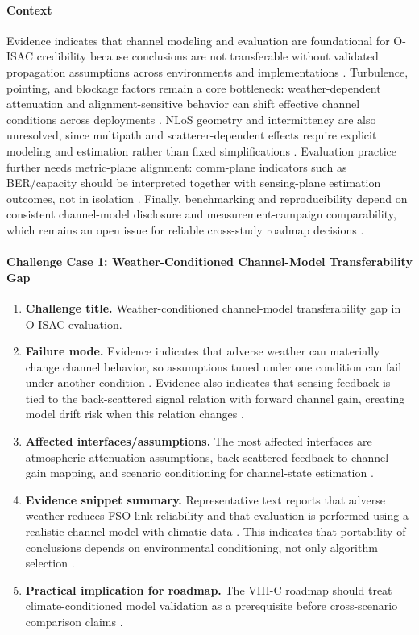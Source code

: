 \documentclass[lettersize,journal]{IEEEtran}
\begin{document}
\paragraph{Context}
Evidence indicates that channel modeling and evaluation are foundational for O-ISAC credibility because conclusions are not transferable without validated propagation assumptions across environments and implementations \cite{O_ISAC_005, O_ISAC_327}. Turbulence, pointing, and blockage factors remain a core bottleneck: weather-dependent attenuation and alignment-sensitive behavior can shift effective channel conditions across deployments \cite{O_ISAC_005, O_ISAC_327}. NLoS geometry and intermittency are also unresolved, since multipath and scatterer-dependent effects require explicit modeling and estimation rather than fixed simplifications \cite{O_ISAC_050}. Evaluation practice further needs metric-plane alignment: comm-plane indicators such as BER/capacity should be interpreted together with sensing-plane estimation outcomes, not in isolation \cite{O_ISAC_381, O_ISAC_050}. Finally, benchmarking and reproducibility depend on consistent channel-model disclosure and measurement-campaign comparability, which remains an open issue for reliable cross-study roadmap decisions \cite{O_ISAC_327}.

\paragraph{Challenge Case 1: Weather-Conditioned Channel-Model Transferability Gap}
\begin{enumerate}
    \item \textbf{Challenge title.} Weather-conditioned channel-model transferability gap in O-ISAC evaluation.
    \item \textbf{Failure mode.} Evidence indicates that adverse weather can materially change channel behavior, so assumptions tuned under one condition can fail under another condition \cite{O_ISAC_005}. Evidence also indicates that sensing feedback is tied to the back-scattered signal relation with forward channel gain, creating model drift risk when this relation changes \cite{O_ISAC_005}.
    \item \textbf{Affected interfaces/assumptions.} The most affected interfaces are atmospheric attenuation assumptions, back-scattered-feedback-to-channel-gain mapping, and scenario conditioning for channel-state estimation \cite{O_ISAC_005}.
    \item \textbf{Evidence snippet summary.} Representative text reports that adverse weather reduces FSO link reliability and that evaluation is performed using a realistic channel model with climatic data \cite{O_ISAC_005}. This indicates that portability of conclusions depends on environmental conditioning, not only algorithm selection \cite{O_ISAC_005}.
    \item \textbf{Practical implication for roadmap.} The VIII-C roadmap should treat climate-conditioned model validation as a prerequisite before cross-scenario comparison claims \cite{O_ISAC_005}.
\end{enumerate}
\end{document}

